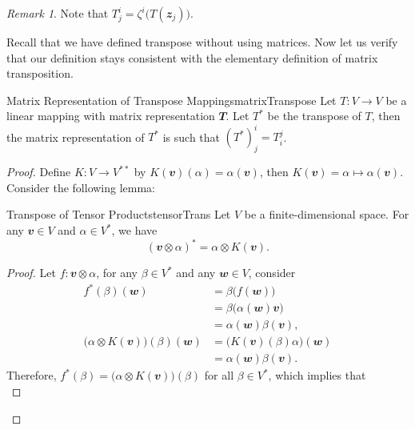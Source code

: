 \documentclass[math]{amznotes}
\theoremstyle{remark}
\newtheorem*{remark}{Remark}
\begin{document}
\begin{notebox}
    \begin{remark}
        Note that $T^i_j = \zeta^i\bigl(T(\mathbfit{z}_j)\bigr)$.
    \end{remark}
\end{notebox}
Recall that we have defined transpose without using matrices. Now let us verify that our definition stays consistent with the elementary definition of matrix transposition.
\begin{probox}{Matrix Representation of Transpose Mappings}{matrixTranspose}
    Let $T \colon V \to V$ be a linear mapping with matrix representation $\mathbfit{T}$. Let $T^*$ be the transpose of $T$, then the matrix representation of $T^*$ is such that $\left(T^*\right)^{i}_j = T^j_i$.
    \tcblower
    \begin{proof}
        Define $K \colon V \to V^{**}$ by $K(\mathbfit{v})(\alpha) = \alpha(\mathbfit{v})$, then $K(\mathbfit{v}) = \alpha \mapsto \alpha(\mathbfit{v})$. Consider the following lemma:
        \begin{lembox}{Transpose of Tensor Products}{tensorTrans}
            Let $V$ be a finite-dimensional space. For any $\mathbfit{v} \in V$ and $\alpha \in V^*$, we have 
            \begin{equation*}
                \left(\mathbfit{v} \otimes \alpha\right)^* = \alpha \otimes K(\mathbfit{v}).
            \end{equation*}
            \tcblower
            \begin{proof}
                Let $f \colon \mathbfit{v} \otimes \alpha$, for any $\beta \in V^*$ and any $\mathbfit{w} \in V$, consider 
                \begin{align*}
                    f^*(\beta)(\mathbfit{w}) & = \beta\bigl(f(\mathbfit{w})\bigr) \\
                    & = \beta\bigl(\alpha(\mathbfit{w})\mathbfit{v}\bigr) \\
                    & = \alpha(\mathbfit{w})\beta(\mathbfit{v}), \\
                    \bigl(\alpha \otimes K(\mathbfit{v})\bigr)(\beta)(\mathbfit{w}) & = \bigl(K(\mathbfit{v})(\beta)\alpha\bigr)(\mathbfit{w}) \\
                    & = \alpha(\mathbfit{w})\beta(\mathbfit{v}).
                \end{align*}     
                Therefore, $f^*(\beta) =  \bigl(\alpha \otimes K(\mathbfit{v})\bigr)(\beta)$ for all $\beta \in V^*$, which implies that 
                \begin{equation*}

\end{equation*}
\end{proof}
\end{lembox}
\end{proof}
\end{probox}
\end{document}
